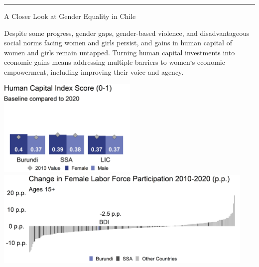 \documentclass[
]{article}
\begin{document}
\vspace{.3cm}

\centering\rule{19.5cm}{0.5pt}

\vspace{.3cm}

\begin{minipage}[c][1.65cm][t]{19.5cm}
\begin{minipage}[c][1.65cm][t]{6cm}
\begin{spacing}{2}\fontsize{14}{1}\selectfont   
A Closer Look at Gender Equality in Chile
\normalsize
\end{spacing}\end{minipage}\hspace{0.5cm}
\begin{minipage}[c][1.65cm][t]{12.75cm}
\fontsize{9}{8}\selectfont   
Despite some progress, gender gaps, gender-based violence, and disadvantageous social norms facing women and girls persist, and gains in human capital of women and girls remain untapped. Turning human capital investments into economic gains means addressing multiple barriers to women`s economic empowerment, including improving their voice and agency.
\normalsize
\end{minipage}
\end{minipage}

\vspace{.15cm}

\begin{minipage}[t][4.7cm][t]{19.5cm}
\href{https://genderdata.worldbank.org/indicators/hd-hci-ovrl}{\includegraphics[height=4.7cm]{rdata/HCIplot.png}}\hspace{.2cm}
\href{https://genderdata.worldbank.org/indicators/sl-tlf-acti-zs/}{\includegraphics[height=4.7cm]{rdata/LFPplot.png}}  
\end{minipage}
\end{document}
